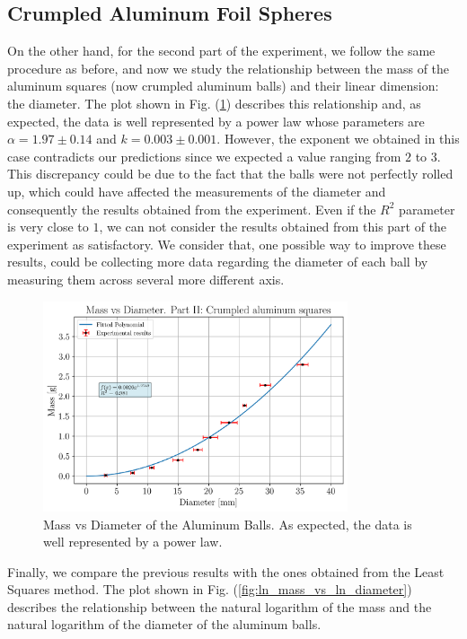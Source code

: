 \documentclass[a4paper,12pt]{article}
\begin{document}
\subsection{Crumpled Aluminum Foil Spheres}
On the other hand, for the second part of the experiment, we follow the same procedure as before, and now we study the relationship between the mass 
of the aluminum squares (now crumpled aluminum balls) and their linear dimension: the diameter. The plot shown in Fig. (\ref{fig:mass_vs_diameter}) 
describes this relationship and, as expected, the data is well represented by a power law whose parameters are $\alpha = 1.97 \pm 0.14$ and $k = 0.003 \pm 0.001$. 
However, the exponent we obtained in this case contradicts our predictions since we expected a value ranging from $2$ to $3$. This discrepancy could be due to the fact 
that the balls were not perfectly rolled up, which could have affected the measurements of the diameter and consequently the results obtained from the experiment. Even if the $R^2$ parameter is very close to $1$, 
we can not consider the results obtained from this part of the experiment as satisfactory. 
We consider that, one possible way to improve these results, could be collecting more data regarding the diameter of each ball by measuring them across several more different axis. 

\begin{figure}[h!]
    \centering
    \includegraphics[width = 0.8\textwidth]{mass_vs_diameter.png}
    \caption{Mass vs Diameter of the Aluminum Balls. As expected, the data is well represented by a power law.}
    \label{fig:mass_vs_diameter}
\end{figure}

Finally, we compare the previous results with the ones obtained from the Least Squares method. The plot shown in Fig. (\ref{fig:ln_mass_vs_ln_diameter}) describes the relationship between the natural logarithm of the mass and the natural logarithm of the diameter of the aluminum balls.
\end{document}
